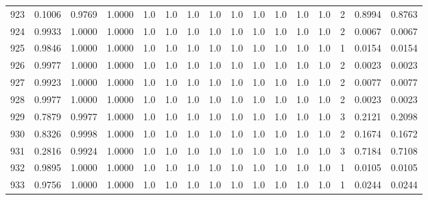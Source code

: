 \begin{tabular}{lrrrrrrrrrrrrrrr}
923 &      0.1006 &  0.9769 &  1.0000 &     1.0 &     1.0 &     1.0 &     1.0 &     1.0 &     1.0 &     1.0 &      1.0 &        1.0 &      2 &                    0.8994 &                     0.8763 \\
924 &      0.9933 &  1.0000 &  1.0000 &     1.0 &     1.0 &     1.0 &     1.0 &     1.0 &     1.0 &     1.0 &      1.0 &        1.0 &      2 &                    0.0067 &                     0.0067 \\
925 &      0.9846 &  1.0000 &  1.0000 &     1.0 &     1.0 &     1.0 &     1.0 &     1.0 &     1.0 &     1.0 &      1.0 &        1.0 &      1 &                    0.0154 &                     0.0154 \\
926 &      0.9977 &  1.0000 &  1.0000 &     1.0 &     1.0 &     1.0 &     1.0 &     1.0 &     1.0 &     1.0 &      1.0 &        1.0 &      2 &                    0.0023 &                     0.0023 \\
927 &      0.9923 &  1.0000 &  1.0000 &     1.0 &     1.0 &     1.0 &     1.0 &     1.0 &     1.0 &     1.0 &      1.0 &        1.0 &      2 &                    0.0077 &                     0.0077 \\
928 &      0.9977 &  1.0000 &  1.0000 &     1.0 &     1.0 &     1.0 &     1.0 &     1.0 &     1.0 &     1.0 &      1.0 &        1.0 &      2 &                    0.0023 &                     0.0023 \\
929 &      0.7879 &  0.9977 &  1.0000 &     1.0 &     1.0 &     1.0 &     1.0 &     1.0 &     1.0 &     1.0 &      1.0 &        1.0 &      3 &                    0.2121 &                     0.2098 \\
930 &      0.8326 &  0.9998 &  1.0000 &     1.0 &     1.0 &     1.0 &     1.0 &     1.0 &     1.0 &     1.0 &      1.0 &        1.0 &      2 &                    0.1674 &                     0.1672 \\
931 &      0.2816 &  0.9924 &  1.0000 &     1.0 &     1.0 &     1.0 &     1.0 &     1.0 &     1.0 &     1.0 &      1.0 &        1.0 &      3 &                    0.7184 &                     0.7108 \\
932 &      0.9895 &  1.0000 &  1.0000 &     1.0 &     1.0 &     1.0 &     1.0 &     1.0 &     1.0 &     1.0 &      1.0 &        1.0 &      1 &                    0.0105 &                     0.0105 \\
933 &      0.9756 &  1.0000 &  1.0000 &     1.0 &     1.0 &     1.0 &     1.0 &     1.0 &     1.0 &     1.0 &      1.0 &        1.0 &      1 &                    0.0244 &                     0.0244 \\

\end{tabular}
